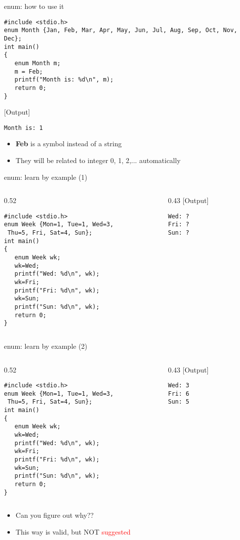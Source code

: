\begin{frame}[fragile]{enum: how to use it}
\begin{lstlisting}
#include <stdio.h>
enum Month {Jan, Feb, Mar, Apr, May, Jun, Jul, Aug, Sep, Oct, Nov, Dec};
int main()
{
   enum Month m;
   m = Feb;
   printf("Month is: %d\n", m);
   return 0;
}
\end{lstlisting}
[Output]
\begin{lstlisting}
Month is: 1
\end{lstlisting}
\begin{itemize}
	\item {\textbf{Feb} is a symbol instead of a string}
	\item {They will be related to integer 0, 1, 2,... automatically}
\end{itemize}

\end{frame}

\begin{frame}[fragile]{enum: learn by example (1)}
\begin{columns}
\begin{column}{0.52\linewidth}
\begin{lstlisting}
#include <stdio.h>
enum Week {Mon=1, Tue=1, Wed=3,
 Thu=5, Fri, Sat=4, Sun};
int main()
{
   enum Week wk;
   wk=Wed;
   printf("Wed: %d\n", wk);
   wk=Fri;
   printf("Fri: %d\n", wk);
   wk=Sun;
   printf("Sun: %d\n", wk);
   return 0;
}
\end{lstlisting}
\end{column}
\begin{column}{0.43\linewidth}
[Output]
\begin{lstlisting}
Wed: ?
Fri: ?
Sun: ?
\end{lstlisting}
\end{column}
\end{columns}
\end{frame}

\begin{frame}[fragile]{enum: learn by example (2)}
\begin{columns}
\begin{column}{0.52\linewidth}
\begin{lstlisting}
#include <stdio.h>
enum Week {Mon=1, Tue=1, Wed=3,
 Thu=5, Fri, Sat=4, Sun};
int main()
{
   enum Week wk;
   wk=Wed;
   printf("Wed: %d\n", wk);
   wk=Fri;
   printf("Fri: %d\n", wk);
   wk=Sun;
   printf("Sun: %d\n", wk);
   return 0;
}
\end{lstlisting}
\end{column}
\begin{column}{0.43\linewidth}
[Output]
\begin{lstlisting}
Wed: 3
Fri: 6
Sun: 5
\end{lstlisting}
\end{column}
\end{columns}
\begin{itemize}
	\item {Can you figure out why??}
	\item {This way is valid, but NOT \textcolor{red}{suggested}}
\end{itemize}
\end{frame}


